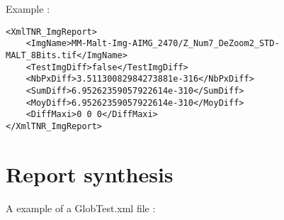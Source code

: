 \documentclass[a4paper]{book}
\begin{document}
Example : 
\begin{lstlisting}
<XmlTNR_ImgReport>
	<ImgName>MM-Malt-Img-AIMG_2470/Z_Num7_DeZoom2_STD-MALT_8Bits.tif</ImgName>
	<TestImgDiff>false</TestImgDiff>
	<NbPxDiff>3.51130082984273881e-316</NbPxDiff>
	<SumDiff>6.95262359057922614e-310</SumDiff>
	<MoyDiff>6.95262359057922614e-310</MoyDiff>
	<DiffMaxi>0 0 0</DiffMaxi>
</XmlTNR_ImgReport>
\end{lstlisting}

\section{Report synthesis}
A example of a GlobTest.xml file :
\end{document}
